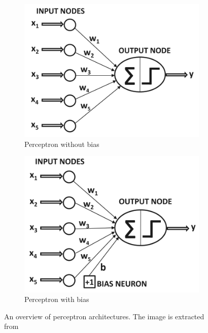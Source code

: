 \begin{figure}[t]

\begin{subfigure}[t]{.5\textwidth}
  \centering
  \includegraphics[width=\linewidth]{Figures/fig_perceptron_wo_bias.png}
  \caption{Perceptron without bias}
  \label{fig:perceptron_wo_bias}
\end{subfigure}%
\hspace{0.5cm}
\begin{subfigure}[t]{.5\textwidth}
  \includegraphics[width=\linewidth]{Figures/fig_perceptron_w_bias.png}
  \caption{Perceptron with bias}
  \label{fig:perceptron_w_bias}
\end{subfigure}
 \caption{An overview of perceptron architectures. The image is extracted from~\protect\cite{DBLP:books/sp/Aggarwal18}} 
  \label{fig:whole_perceptron}
\end{figure}